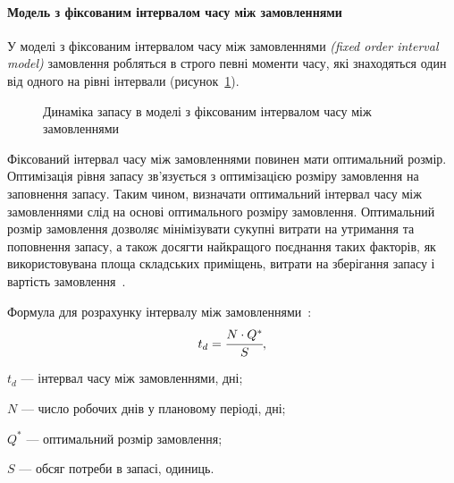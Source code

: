 \paragraph{Модель з фіксованим інтервалом часу між замовленнями}
У моделі з фіксованим інтервалом часу між замовленнями  \textit{(fixed order interval model)} замовлення робляться в строго певні моменти часу, які знаходяться один від одного на рівні інтервали (рисунок~\ref{fig:model_fi:dynamic}).

\begin{figure}[H]
  \centering
{}
  \captionsetup{justification=centering}
  \caption{Динаміка запасу в моделі з фіксованим інтервалом часу між замовленнями}
  \label{fig:model_fi:dynamic}
\end{figure}

Фіксований інтервал часу між замовленнями повинен мати оптимальний розмір. 
Оптимізація рівня запасу зв'язується з оптимізацією розміру замовлення на заповнення запасу. 
Таким чином, визначати оптимальний інтервал часу між замовленнями слід на основі оптимального розміру замовлення. 
Оптимальний розмір замовлення дозволяє мінімізувати сукупні витрати на утримання та поповнення запасу, а також досягти найкращого поєднання таких факторів, як використовувана площа складських приміщень, витрати на зберігання запасу і вартість замовлення~\cite{Sterligova2008}.

Формула для розрахунку інтервалу між замовленнями~\cite{Sterligova2008}:
\begin{equation} \label{eq:model_fi:time}
t_d=\cfrac{N\cdot Q^*}{S}
,
\end{equation}
\begin{description}
	\item[де] $t_d$ --- інтервал часу між замовленнями, дні;
	\item $N$ --- число робочих днів у плановому періоді, дні;
	\item $Q^*$ --- оптимальний розмір замовлення;
	\item $S$ --- обсяг потреби в запасі, одиниць.
\end{description}

